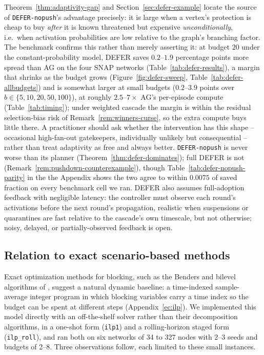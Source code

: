 \documentclass[ASNA,number]{USG}
\begin{document}
Theorem~\ref{thm:adaptivity-gap} and Section~\ref{sec:defer-example}
locate the source of \texttt{DEFER-nopush}'s advantage precisely: it is
large when a vertex's protection is cheap to buy \emph{after} it is known
threatened but expensive \emph{unconditionally}, i.e.\ when activation
probabilities are low relative to the graph's branching factor. The
benchmark confirms this rather than merely asserting it: at budget $20$
under the constant-probability model, DEFER saves $0.2$--$1.9$ percentage
points more spread than AG on the four SNAP networks
(Table~\ref{tab:defer-results}), a margin that shrinks as the budget grows
(Figure~\ref{fig:defer-sweep}, Table~\ref{tab:defer-allbudgets}) and is
somewhat larger at small budgets ($0.2$--$3.9$ points over
$b\in\{5,10,20,50,100\}$), at roughly $2.5$--$7\times$ AG's per-episode
compute (Table~\ref{tab:timing});
under weighted cascade the margin is within the residual selection-bias
risk of Remark~\ref{rem:winners-curse}, so the extra compute buys little
there. A practitioner should ask whether the intervention has this shape
-- occasional high-fan-out gatekeepers, individually unlikely but
consequential -- rather than treat adaptivity as free and always better.
\texttt{DEFER-nopush} is never worse than its planner
(Theorem~\ref{thm:defer-dominates}); full DEFER is not
(Remark~\ref{rem:pushdown-counterexample}), though
Table~\ref{tab:defer-nopush-parity} in the the Appendix shows the two
agree to within $0.0075$ of saved fraction on every benchmark cell we ran.
DEFER also assumes full-adoption feedback with negligible latency: the
controller must observe each round's activations before the next round's
propagation, realistic when suspensions or quarantines are fast relative
to the cascade's own timescale, but not otherwise; noisy, delayed, or
partially-observed feedback is open.

\subsection{Relation to exact scenario-based methods}\label{sec:discussion-exact}

Exact optimization methods for blocking, such as the Benders and bilevel
algorithms of \citet{taninmis2022,taninmis2024}, suggest a natural dynamic
baseline: a time-indexed sample-average integer program in which blocking
variables carry a time index so the budget can be spent at different steps
(Appendix~\ref{ec:ilp}). We implemented this model directly with an
off-the-shelf solver rather than their decomposition algorithms, in a one-shot
form (\texttt{ilp1}) and a rolling-horizon staged form (\texttt{ilp\_roll}),
and ran both on six networks of 34 to 327 nodes with 2--3 seeds and budgets of
2--8. Three observations follow, each limited to these small instances.
\end{document}
